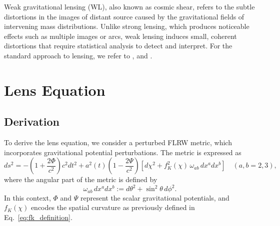 Weak gravitational lensing (WL), also known as cosmic shear, refers to the subtle distortions in the images of distant source caused by the gravitational fields of intervening mass distributions. Unlike strong lensing, which produces noticeable effects such as multiple images or arcs, weak lensing induces small, coherent distortions that require statistical analysis to detect and interpret. For the standard approach to lensing, we refer to \citet{1992grle.book.....S}, \citet{2001PhR...340..291B} and \citet{2010CQGra..27w3001B}.

\section{Lens Equation}
\subsection{Derivation}
To derive the lens equation, we consider a perturbed FLRW metric, which incorporates gravitational potential perturbations. The metric is expressed as
\begin{equation}
    ds^2 = -\left(1 + \frac{2\Phi}{c^2}\right)c^2 dt^2 + a^2(t) \left(1 - \frac{2\Psi}{c^2}\right) \left[ d\chi^2 + f_K^2(\chi) \, \omega_{ab} \, dx^a dx^b \right] \quad (a, b = 2, 3),
    \label{eq:perturbed_metric}
\end{equation}
where the angular part of the metric is defined by
\begin{equation}
    \omega_{ab} \, dx^a dx^b := d\theta^2 + \sin^2 \theta \, d\phi^2.
    \label{eq:angular_metric}
\end{equation}
In this context, \( \Phi \) and \( \Psi \) represent the scalar gravitational potentials, and \( f_K(\chi) \) encodes the spatial curvature as previously defined in Eq.~\eqref{eq:fk_definition}.

